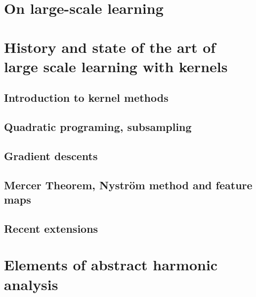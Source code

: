 \section{On large-scale learning}
\label{sec:on_large-scale_learning}

\section{History and state of the art of large scale learning with kernels}
\label{sec:history}

\subsection{Introduction to kernel methods}

\subsection{Quadratic programing, subsampling}

\subsection{Gradient descents}

\subsection{Mercer Theorem, Nystr\"om method and feature maps}

\subsection{Recent extensions}

\section{Elements of abstract harmonic analysis}
\label{sec:abstract_harmonic}


